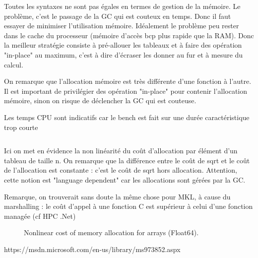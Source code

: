 Toutes les syntaxes ne sont pas égales en termes de gestion de la mémoire.
Le problème, c'est le passage de la GC qui est couteux en temps. Donc il faut essayer de minimiser l'utilisation mémoire. Idéalement le problème peu rester dans le cache du processeur (mémoire d'accès bcp plus rapide que la RAM). Donc la meilleur stratégie consiste à pré-allouer les tableaux et à faire des opération "in-place" au maximum, c'est à dire d'écraser les donner au fur et à mesure du calcul.

On remarque que l'allocation mémoire est très différente d'une fonction à l'autre. Il est important de privilégier des opération "in-place" pour contenir l'allocation mémoire, sinon on risque de déclencher la GC qui est couteuse.

Les temps CPU sont indicatifs car le bench est fait sur une durée caractéristique trop courte

\newpage

\inputminted[linenos,breaklines]{julia}{ap2_bench/bench/sqrt_allocationimpact_code.jl}


Ici on met en évidence la non linéarité du coût d'allocation par élément d'un tableau de taille n.
On remarque que la différence entre le coût de sqrt et le coût de l'allocation est constante : c'est le coût de sqrt 
hors allocation. Attention, cette notion est "language dependent" car les allocations sont gérées par la GC.

Remarque, on trouverait sans doute la même chose pour MKL, à cause du marshalling : le coût d'appel à une fonction C est supérieur à celui d'une fonction managée (cf HPC .Net)

\begin{figure}[h]
\begin{center}
\end{center}
\caption{Nonlinear cost of memory allocation for arrays (Float64).}
\end{figure}



\newpage

https://msdn.microsoft.com/en-us/library/ms973852.aspx



